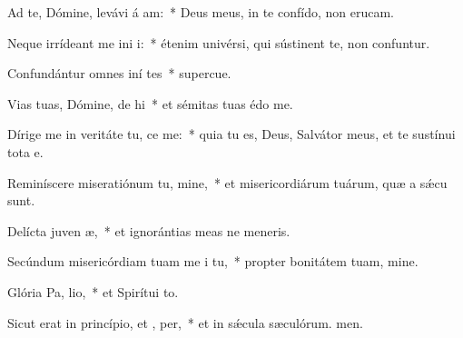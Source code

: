 \item Ad te, Dómine, levávi á am:~* Deus meus, in te confído, non erucam.
\item Neque irrídeant me ini i:~* étenim univérsi, qui sústinent te, non confuntur.
\item Confundántur omnes iní tes~* supercue.
\item Vias tuas, Dómine, de hi~* et sémitas tuas édo me.
\item Dírige me in veritáte tu,  ce me:~* quia tu es, Deus, Salvátor meus, et te sustínui tota e.
\item Reminíscere miseratiónum tu, mine,~* et misericordiárum tuárum, quæ a sǽcu sunt.
\item Delícta juven æ,~* et ignorántias meas ne meneris.
\item Secúndum misericórdiam tuam me i tu,~* propter bonitátem tuam, mine.
\item Glória Pa,  lio,~* et Spirítui to.
\item Sicut erat in princípio, et ,  per,~* et in sǽcula sæculórum. men.
